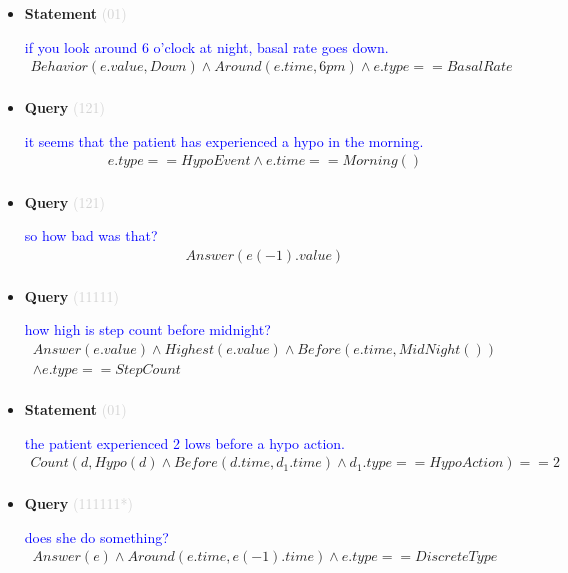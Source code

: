 \documentclass[11pt]{article}
\newcommand{\key}[1]{\textcolor{lightgray}{#1}}
\newcounter{CQuery}
\newcounter{CStatement}
\begin{document}
\begin{itemize}
\item
\textbf{Statement\theCStatement} \key{(01)} \addtocounter{CStatement}{1}
\textcolor{blue}{ if you look around 6 o'clock at night, basal rate goes down. }
\begin{multline*}
Behavior(e.value, Down) \wedge Around(e.time, 6pm) \wedge e.type==BasalRate \\ 
\end{multline*}


\item
\textbf{Query\theCQuery} \key{(121)} \addtocounter{CQuery}{1}
\textcolor{blue}{ it seems that the patient has experienced a hypo in the morning. }
\begin{multline*}
e.type==HypoEvent \wedge e.time==Morning() \\ 
\end{multline*}


\item
\textbf{Query\theCQuery} \key{(121)} \addtocounter{CQuery}{1}
\textcolor{blue}{ so how bad was that? }
\begin{multline*}
Answer(e(-1).value) \\ 
\end{multline*}


\item
\textbf{Query\theCQuery} \key{(11111)} \addtocounter{CQuery}{1}
\textcolor{blue}{ how high is step count before midnight? }
\begin{multline*}
Answer(e.value) \wedge Highest(e.value) \wedge Before(e.time, MidNight()) \\ 
\wedge e.type==StepCount \\ 
\end{multline*}


\item
\textbf{Statement\theCStatement} \key{(01)} \addtocounter{CStatement}{1}
\textcolor{blue}{ the patient experienced 2 lows before a hypo action. }
\begin{multline*}
Count(d, Hypo(d) \wedge Before(d.time, d_1.time) \wedge d_1.type==HypoAction)==2 \\ 
\end{multline*}


\item
\textbf{Query\theCQuery} \key{(111111*)} \addtocounter{CQuery}{1}
\textcolor{blue}{ does she do something? }
\begin{multline*}
Answer(e) \wedge Around(e.time, e(-1).time) \wedge e.type==DiscreteType \\ 
\end{multline*}



\end{itemize}
\end{document}
